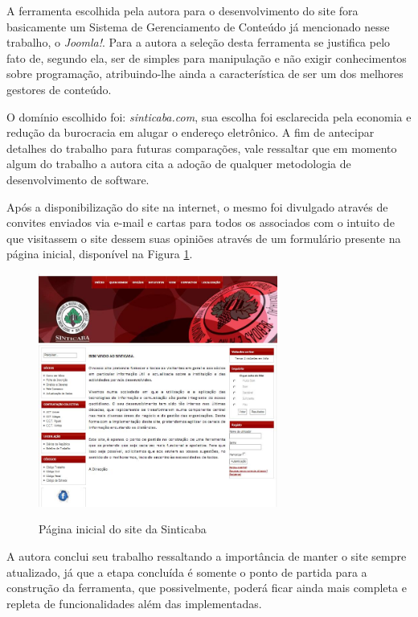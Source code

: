 A ferramenta escolhida pela autora para o desenvolvimento do site fora basicamente um Sistema de Gerenciamento de Conteúdo já mencionado nesse trabalho, o \textit{Joomla!}. Para a autora a seleção desta ferramenta se justifica pelo fato de, segundo ela, ser de simples para manipulação e não exigir conhecimentos sobre programação, atribuindo-lhe ainda a característica de ser um dos melhores gestores de conteúdo.

O domínio escolhido foi: \textit{sinticaba.com}, sua escolha foi esclarecida pela economia e redução da burocracia em alugar o endereço eletrônico. A fim de antecipar detalhes do trabalho para futuras comparações, vale ressaltar que em momento algum do trabalho a autora cita a adoção de qualquer metodologia de desenvolvimento de software.

Após a disponibilização do site na internet, o mesmo foi divulgado através de convites enviados via e-mail e cartas para todos os associados com o intuito de que visitassem o site dessem suas opiniões através de um formulário presente na página inicial, disponível na Figura \ref{pagina-inicial-sindicato}.

\begin{figure}[htb]
 \centering
 \caption{Página inicial do site da Sinticaba}
 \includegraphics[width=0.7\textwidth]{figuras/pInicial-Sindicato}
 \label{pagina-inicial-sindicato}
\end{figure}


A autora conclui seu trabalho ressaltando a importância de manter o site sempre atualizado, já que a etapa concluída é somente o ponto de partida para a construção da ferramenta, que possivelmente, poderá ficar ainda mais completa e repleta de funcionalidades além das implementadas. 

